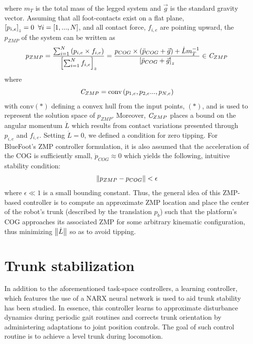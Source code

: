 		where $m_{T}$ is the total mass of the legged system and $\vec{g}$ is the standard gravity vector. Assuming that all foot-contacts exist on a flat plane, \IE $\left[p_{i,e}\right]_{z}=0\hspace{2mm} \forall i=[1,...,N]$, and all contact force, $f_{i,e}$ are pointing upward, the $p_{ZMP}$ of the system can be written as
			\begin{equation}
				p_{ZMP} 
				= 
				\frac{ \sum_{i=1}^{N} \left( p_{i,e} \times f_{i,e} \right) }{ \left[\sum_{i=1}^{N} f_{i,e}\right]_{z} }
				= 
				\frac{ 	p_{COG} \times \left( \ddot{p}_{COG} + \vec{g} \right) + \dot{L}m_{T}^{-1} }{ \left[ \ddot{p}_{COG} + \vec{g} \right]_{z}}
				\in \emph{C}_{ZMP} 
			\end{equation}
		where
			\begin{equation}
				\emph{C}_{ZMP} = \text{conv}\left(p_{1,e},p_{2,e}...,p_{N,e}\right)
			\end{equation}
		with $\text{conv}(*)$ defining a convex hull from the  input points, $(*)$, and is used to represent the solution space of $p_{ZMP}$. Moreover, $\emph{C}_{ZMP}$ places a bound on the angular momentum $\dot{L}$ which results from contact variations presented through $p_{i,e}$ and $f_{i,e}$. Setting $\dot{L}=0$, we defined a condition for zero tipping. For BlueFoot's ZMP controller formulation, it is also assumed that the acceleration of the COG is sufficiently small, \IE $\ddot{p}_{COG}\approx0$ which yields the following, intuitive stability condition:
			\begin{equation}
				\left\lVert p_{ZMP} - p_{COG}\right\rVert < \epsilon
			\end{equation}
		where $\epsilon\ll1$ is a small bounding constant. Thus, the general idea of this ZMP-based controller is to compute an approximate ZMP location and place the center of the robot's trunk (described by the translation $p_{b}$) such that the platform's COG approaches its associated ZMP for some arbitrary kinematic configuration, thus minimizing $\left\lVert\dot{L}\right\rVert$ so as to avoid tipping.


		\section{Trunk stabilization}

		In addition to the aforementioned task-space controllers, a learning controller, which features the use of a NARX neural network is used to aid trunk stability has been studied. In essence, this controller learns to approximate disturbance dynamics during periodic gait routines and corrects trunk orientation by administering adaptations to joint position controls. The goal of such control routine is to achieve a level trunk during locomotion.
			
